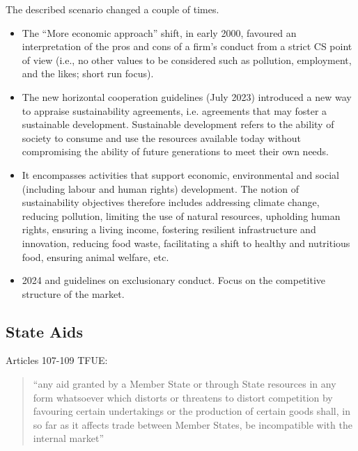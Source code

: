         The described scenario changed a couple of times. 
        \begin{itemize}
            \item The “More economic approach” shift, in early 2000, favoured an interpretation of the pros and cons of a firm’s conduct from a strict CS point of view (i.e., no other values to be considered such as pollution, employment, and the likes; short run focus).
            \item The new horizontal cooperation guidelines (July 2023) introduced a new way to appraise sustainability agreements, i.e. agreements that may foster a sustainable development. Sustainable development refers to the ability of society to consume and use the resources available today without compromising the ability of future generations to meet their own needs.
            \item It encompasses activities that support economic, environmental and social (including labour and human rights) development. The notion of sustainability objectives therefore includes addressing climate change, reducing pollution, limiting the use of natural resources, upholding human rights, ensuring a living income, fostering resilient infrastructure and innovation, reducing food waste, facilitating a shift to healthy and nutritious food, ensuring animal welfare, etc.
            \item 2024 and guidelines on exclusionary conduct. Focus on the competitive structure of the market. 
        \end{itemize}

    \subsection{State Aids}


        Articles 107-109 TFUE:
            \begin{quote}
                “any aid granted by a Member State or through State resources in any form whatsoever which distorts or threatens to distort competition by favouring certain undertakings or the production of certain goods shall, in so far as it affects trade between Member States, be incompatible with the internal market”
            \end{quote}